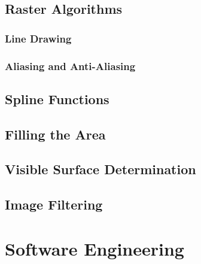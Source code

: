 \documentclass{mini}
\begin{document}
\section{Raster Algorithms}

\subsection{Line Drawing}

\subsection{Aliasing and Anti-Aliasing}

\section{Spline Functions}

\section{Filling the Area}

\section{Visible Surface Determination}

\section{Image Filtering}

\chapter{Software Engineering}


\begin{thebibliography}{1}

\end{thebibliography}
\end{document}
